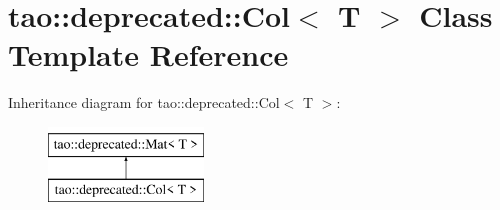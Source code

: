 \hypertarget{classtao_1_1deprecated_1_1_col}{}\section{tao\+::deprecated\+::Col$<$ T $>$ Class Template Reference}
\label{classtao_1_1deprecated_1_1_col}
Inheritance diagram for tao\+::deprecated\+::Col$<$ T $>$\+:\begin{figure}[H]
\begin{center}
\leavevmode
\includegraphics[height=2.000000cm]{classtao_1_1deprecated_1_1_col}
\end{center}
\end{figure}
